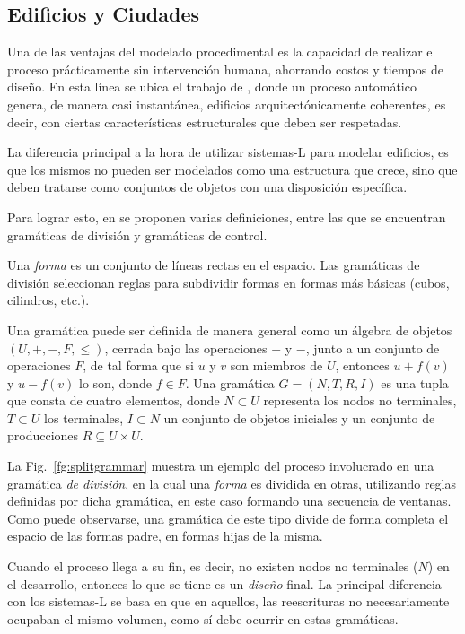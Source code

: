 \subsection{Edificios y Ciudades}
Una de las ventajas del modelado procedimental es la capacidad de realizar el proceso prácticamente sin intervención humana, ahorrando costos y tiempos de diseño.
En esta línea se ubica el trabajo de \cite{Wonka2003}, donde un proceso automático genera, de manera casi instantánea, edificios arquitectónicamente coherentes, es decir, con ciertas características estructurales que deben ser respetadas.

La diferencia principal a la hora de utilizar sistemas-L para modelar edificios, es que los mismos no pueden ser modelados como una estructura que crece, sino que deben tratarse como conjuntos de objetos con una disposición específica.

Para lograr esto, en \cite{Wonka2003} se proponen varias definiciones, entre las que se encuentran gramáticas de división y gramáticas de control.

Una {\em forma} es un conjunto de líneas rectas en el espacio.
Las gramáticas de división seleccionan reglas para subdividir formas en formas más básicas (cubos, cilindros, etc.).


Una gramática puede ser definida de manera general como un álgebra de objetos $(U,+,-,F,\leq)$, cerrada bajo las operaciones $+$ y $-$, junto a un conjunto de operaciones $F$, de tal forma que si $u$ y $v$ son miembros de $U$, entonces $u+f(v)$ y $u-f(v)$ lo son, donde $f \in F$.
Una gramática $G=(N,T,R,I)$ es una tupla que consta de cuatro elementos, donde $N \subset U$ representa los nodos no terminales, $T \subset U$ los terminales, $I \subset N$ un conjunto de objetos iniciales y un conjunto de producciones $R \subseteq U \times U$.


La Fig.~\ref{fg:splitgrammar} muestra un ejemplo del proceso involucrado en una gramática {\em de división}, en la cual una {\em forma} es dividida en otras, utilizando reglas definidas por dicha gramática, en este caso formando una secuencia de ventanas.
Como puede observarse, una gramática de este tipo divide de forma completa el espacio de las formas padre, en formas hijas de la misma.

Cuando el proceso llega a su fin, es decir, no existen nodos no terminales ($N$) en el desarrollo, entonces lo que se tiene es un {\em diseño} final.
La principal diferencia con los sistemas-L se basa en que en aquellos, las reescrituras no necesariamente ocupaban el mismo volumen, como sí debe ocurrir en estas gramáticas.

